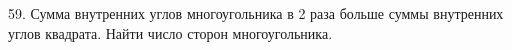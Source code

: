 59. Сумма внутренних углов многоугольника в 2 раза больше суммы внутренних углов квадрата. Найти число сторон многоугольника.\\
